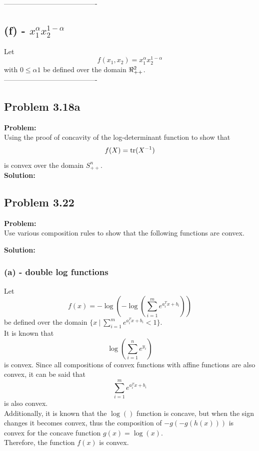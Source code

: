 \documentclass[letter]{article}
\begin{document}
----------------------------------------

\subsection{(f) - $x_1^\alpha x_2^{1-\alpha}$}
Let $$f(x_1,x_2) = x_1^\alpha x_2^{1-\alpha}$$ with $0 \leq \alpha 1$ be defined over the domain $\real_{++}^2$.\\




----------------------------------------






\subsection{Problem 3.18a}
\textbf{Problem:}\\
Using the proof of concavity of the log-determinant function to show that $$f(X) = \trace(X^{-1})$$ is convex over the domain $S_{++}^n$.\\

\noindent
\textbf{Solution:}\\















\subsection{Problem 3.22}
\textbf{Problem:}\\
Use various composition rules to show that the following functions are convex.

\noindent
\textbf{Solution:}\\
\subsubsection{(a) - double log functions}
Let $$f(x) = -\log(-\log(\sum_{i=1}^m e^{a_i^T x + b_i}))$$ be defined over the domain $\{x \ | \ \sum_{i=1}^m e^{a_i^T x + b_i} < 1\}$.\\
It is known that $$\log(\sum_{i=1}^{n} e^{y_i})$$ is convex. Since all compositions of convex functions with affine functions are also convex, it can be said that $$\sum_{i=1}^m e^{a_i^T x + b_i}$$ is also convex.\\
Additionally, it is known that the $\log()$ function is concave, but when the sign changes it becomes convex, thus the composition of $-g(-g(h(x)))$ is convex for the concave function $g(x) = \log(x)$.\\
Therefore, the function $f(x)$ is convex.
\end{document}

